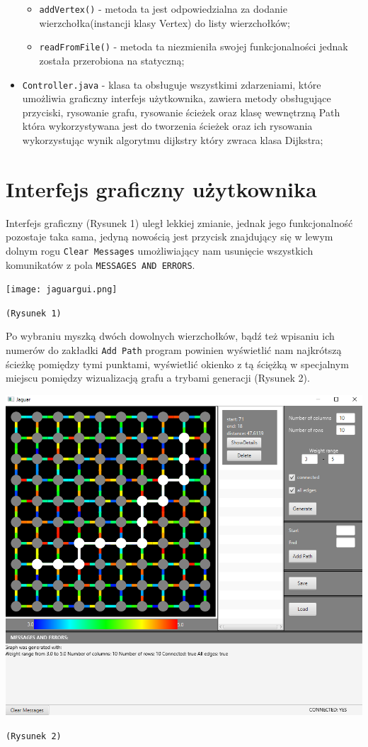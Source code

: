 \documentclass[]{article}
\begin{document}
\begin{itemize}
\begin{itemize}
\item
\texttt{addVertex()} - metoda ta jest odpowiedzialna za dodanie wierzchołka(instancji klasy Vertex) do listy wierzchołków;
\item
\texttt{readFromFile()} - metoda ta niezmieniła swojej funkcjonalności jednak została przerobiona na statyczną;
\end{itemize}
\item
\texttt{Controller.java} - klasa ta obsługuje wszystkimi zdarzeniami, które umożliwia graficzny interfejs użytkownika, zawiera metody obsługujące przyciski, rysowanie grafu, rysowanie ścieżek oraz klasę wewnętrzną Path która wykorzystywana jest do tworzenia ścieżek oraz ich rysowania wykorzystując wynik algorytmu dijkstry który zwraca klasa Dijkstra;
\end{itemize}
\section{Interfejs graficzny użytkownika}\label{header-n279}
Interfejs graficzny (Rysunek 1) uległ lekkiej zmianie, jednak jego funkcjonalność pozostaje taka sama, jedyną nowością jest przycisk znajdujący się w lewym dolnym rogu \texttt{Clear Messages} umożliwiający nam usunięcie wszystkich komunikatów z pola \texttt{MESSAGES AND ERRORS}.

\texttt{[image: jaguargui.png]}
\begin{center}
\texttt{(Rysunek 1)}
\end{center}

Po wybraniu myszką dwóch dowolnych wierzchołków, bądź też wpisaniu ich numerów do zakładki \texttt{Add Path} program powinien wyświetlić nam najkrótszą ścieżkę pomiędzy tymi punktami, wyświetlić okienko z tą ściężką w specjalnym miejscu pomiędzy wizualizacją grafu a trybami generacji (Rysunek 2).

\includegraphics[scale=0.5]{gui_paths}
\begin{center}
\texttt{(Rysunek 2)}
\end{center}
\end{document}
